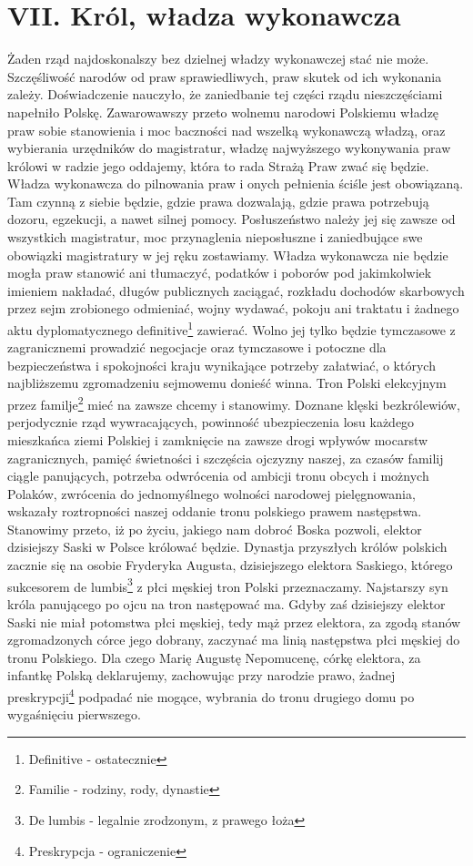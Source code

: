 \documentclass{book}
\begin{document}
 
\section*{VII. Król, władza wykonawcza}

 Żaden rząd najdoskonalszy bez dzielnej władzy wykonawczej stać nie może. Szczęśliwość narodów od praw sprawiedliwych, praw skutek od ich wykonania zależy. Doświadczenie nauczyło, że zaniedbanie tej części rządu nieszczęściami napełniło Polskę. Zawarowawszy przeto wolnemu narodowi Polskiemu władzę praw sobie stanowienia i moc baczności nad wszelką wykonawczą władzą, oraz wybierania urzędników do magistratur, władzę najwyższego wykonywania praw królowi w radzie jego oddajemy, która to rada Strażą Praw zwać się będzie. Władza wykonawcza do pilnowania praw i onych pełnienia ściśle jest obowiązaną. Tam czynną z siebie będzie, gdzie prawa dozwalają, gdzie prawa potrzebują dozoru, egzekucji, a nawet silnej pomocy.  Posłuszeństwo należy jej się zawsze od wszystkich magistratur, moc przynaglenia nieposłuszne i zaniedbujące swe obowiązki magistratury w jej ręku zostawiamy.  Władza wykonawcza nie będzie mogła praw stanowić ani tłumaczyć, podatków i poborów pod jakimkolwiek imieniem nakładać, długów publicznych zaciągać, rozkładu dochodów skarbowych przez sejm zrobionego odmieniać,  wojny wydawać, pokoju ani traktatu  i żadnego aktu dyplomatycznego definitive\footnote{Definitive - ostatecznie} zawierać. Wolno jej tylko będzie tymczasowe z zagranicznemi prowadzić negocjacje oraz tymczasowe i potoczne dla bezpieczeństwa i spokojności kraju wynikające potrzeby załatwiać,  o których najbliższemu zgromadzeniu sejmowemu donieść winna.  Tron Polski elekcyjnym przez familje\footnote{Familie - rodziny, rody, dynastie} mieć na zawsze chcemy i stanowimy.  Doznane klęski bezkrólewiów, perjodycznie rząd wywracających, powinność ubezpieczenia losu każdego mieszkańca ziemi Polskiej i zamknięcie na zawsze drogi wpływów mocarstw zagranicznych, pamięć świetności i szczęścia ojczyzny naszej, za czasów familij ciągle panujących, potrzeba odwrócenia od ambicji tronu obcych i możnych Polaków,  zwrócenia do jednomyślnego wolności narodowej pielęgnowania, wskazały roztropności naszej oddanie tronu polskiego prawem następstwa.  Stanowimy przeto, iż po życiu, jakiego nam dobroć Boska pozwoli, elektor dzisiejszy Saski w Polsce królować będzie.  Dynastja przyszłych królów polskich zacznie się na osobie Fryderyka Augusta, dzisiejszego elektora Saskiego, którego sukcesorem de lumbis\footnote{De lumbis - legalnie zrodzonym, z prawego łoża} z płci męskiej tron Polski przeznaczamy. Najstarszy syn króla panującego po ojcu na tron następować ma.  Gdyby zaś dzisiejszy elektor Saski nie miał potomstwa płci męskiej, tedy mąż przez elektora, za zgodą stanów zgromadzonych córce jego dobrany, zaczynać ma linią następstwa płci męskiej do tronu Polskiego.  Dla czego Marię Augustę Nepomucenę, córkę elektora, za infantkę Polską deklarujemy, zachowując przy narodzie prawo, żadnej preskrypcji\footnote{Preskrypcja - ograniczenie} podpadać nie mogące, wybrania do tronu drugiego domu po wygaśnięciu pierwszego. 
\end{document}

